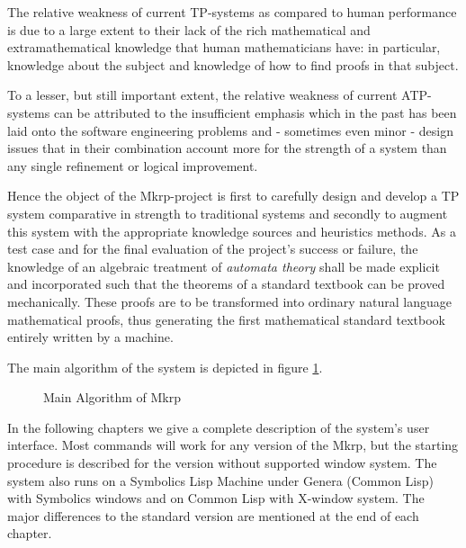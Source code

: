 The relative weakness of current TP-systems as compared to human 
performance is due to a large 
extent to their lack of the rich mathematical and extramathematical 
knowledge that human 
mathematicians have: in particular, knowledge about the subject and 
knowledge of how to find proofs 
in that subject.

To a lesser, but still important extent, the relative weakness of
current ATP-systems can be attributed to the insufficient emphasis
which in the past has been laid onto the software engineering problems
and - sometimes even minor - design issues that in their combination
account more for the strength of a system than any single refinement
or logical improvement.

Hence the object of the {\sc Mkrp}-project is first to carefully
design and develop a TP system comparative in strength to traditional
systems and secondly to augment this system with the appropriate
knowledge sources and heuristics methods. As a test case and for the
final evaluation of the project's success or failure, the knowledge of
an algebraic treatment of {\em automata theory\/} shall be made
explicit and incorporated such that the theorems of a standard
textbook \cite {Deussen71} can be proved mechanically.  These proofs
are to be transformed into ordinary natural language mathematical
proofs, thus generating the first mathematical standard textbook
entirely written by a machine.

The main algorithm of the system is depicted in figure 
\ref{MainAlgorithmofMKRP}.\begin{figure}[bt]
\caption{Main Algorithm of {\sc Mkrp} }
\label{MainAlgorithmofMKRP}
\begin{center}
\end{center}
\end{figure}
In the following chapters we give a complete description of the
system's user interface. Most commands will work for any version of
the {\sc Mkrp}, but the starting procedure is described for the
version without supported window system. 
 The system also runs on a Symbolics Lisp
Machine  under Genera (Common Lisp) with Symbolics
windows and on Common Lisp with X-window system. The major differences
to the standard version are mentioned at the end of each chapter.

